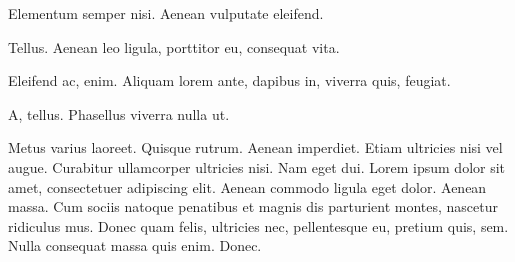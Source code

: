 \documentclass[
    12pt,
    letterpaper,
    oneside,
    noraggedright
]{turabian-researchpaper}
\begin{document}
Elementum semper nisi. Aenean vulputate eleifend.

Tellus. Aenean leo ligula, porttitor eu, consequat vita.

Eleifend ac, enim. Aliquam lorem ante, dapibus in, viverra quis,
feugiat.

A, tellus. Phasellus viverra nulla ut.

Metus varius laoreet. Quisque rutrum. Aenean imperdiet. Etiam ultricies
nisi vel augue. Curabitur ullamcorper ultricies nisi. Nam eget dui.
Lorem ipsum dolor sit amet, consectetuer adipiscing elit. Aenean commodo
ligula eget dolor. Aenean massa. Cum sociis natoque penatibus et magnis
dis parturient montes, nascetur ridiculus mus. Donec quam felis,
ultricies nec, pellentesque eu, pretium quis, sem. Nulla consequat massa
quis enim. Donec.
\end{document}

